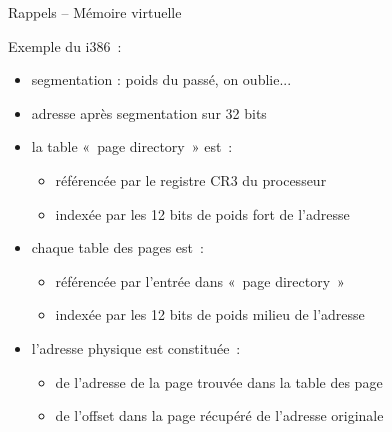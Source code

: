 \begin {frame} {Rappels -- Mémoire virtuelle}

    Exemple du i386~:

    \begin {itemize}
	\item segmentation : poids du passé, on oublie...
	\item adresse après segmentation sur 32 bits
	\item la table «~page directory~» est~:
	    \begin {itemize}
		\item référencée par le registre CR3 du processeur
		\item indexée par les 12 bits de poids fort de l'adresse
	    \end {itemize}
	\item chaque table des pages est~:
	    \begin {itemize}
		\item référencée par l'entrée dans «~page directory~»
		\item indexée par les 12 bits de poids milieu de l'adresse
	    \end {itemize}
	\item l'adresse physique est constituée~:
	    \begin {itemize}
		\item de l'adresse de la page trouvée dans la table des page
		\item de l'offset dans la page récupéré de l'adresse originale
	    \end {itemize}

    \end {itemize}

\end {frame}


